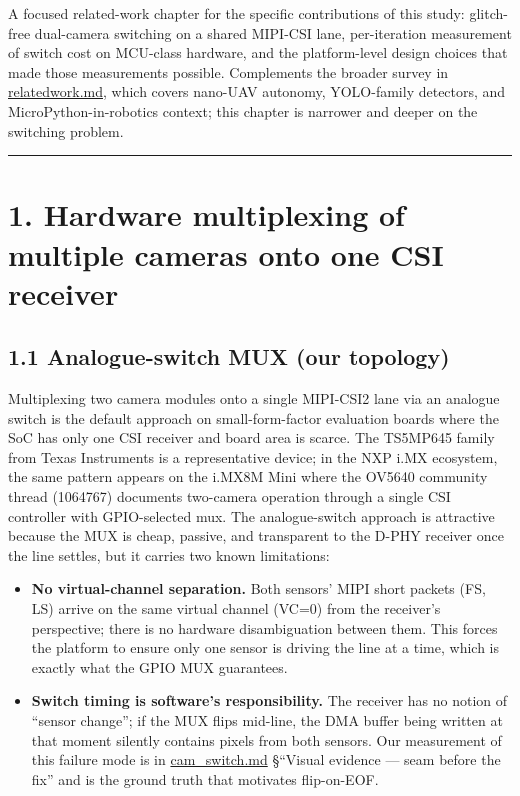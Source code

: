 A focused related-work chapter for the specific contributions of this
study: glitch-free dual-camera switching on a shared MIPI-CSI lane,
per-iteration measurement of switch cost on MCU-class hardware, and the
platform-level design choices that made those measurements possible.
Complements the broader survey in \url{relatedwork.md}, which covers
nano-UAV autonomy, YOLO-family detectors, and MicroPython-in-robotics
context; this chapter is narrower and deeper on the switching problem.

\begin{center}\rule{0.5\linewidth}{0.5pt}\end{center}

\section{1. Hardware multiplexing of multiple cameras onto one CSI
receiver}\label{hardware-multiplexing-of-multiple-cameras-onto-one-csi-receiver}

\subsection{1.1 Analogue-switch MUX (our
topology)}\label{analogue-switch-mux-our-topology}

Multiplexing two camera modules onto a single MIPI-CSI2 lane via an
analogue switch is the default approach on small-form-factor evaluation
boards where the SoC has only one CSI receiver and board area is scarce.
The TS5MP645 family from Texas Instruments is a representative device;
in the NXP i.MX ecosystem, the same pattern appears on the i.MX8M Mini
where the OV5640 community thread (1064767) documents two-camera
operation through a single CSI controller with GPIO-selected mux. The
analogue-switch approach is attractive because the MUX is cheap,
passive, and transparent to the D-PHY receiver once the line settles,
but it carries two known limitations:

\begin{itemize}
\tightlist
\item
  \textbf{No virtual-channel separation.} Both sensors' MIPI short
  packets (FS, LS) arrive on the same virtual channel (VC=0) from the
  receiver's perspective; there is no hardware disambiguation between
  them. This forces the platform to ensure only one sensor is driving
  the line at a time, which is exactly what the GPIO MUX guarantees.
\item
  \textbf{Switch timing is software's responsibility.} The receiver has
  no notion of ``sensor change''; if the MUX flips mid-line, the DMA
  buffer being written at that moment silently contains pixels from both
  sensors. Our measurement of this failure mode is in
  \url{cam_switch.md} §``Visual evidence --- seam before the fix'' and
  is the ground truth that motivates flip-on-EOF.
\end{itemize}

